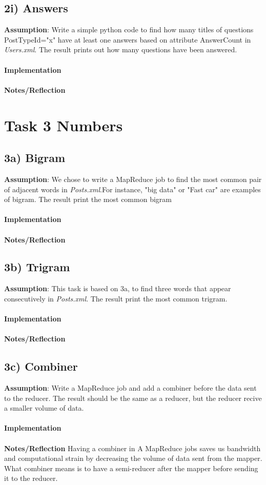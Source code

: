 \documentclass[fleqn,10pt]{wlscirep}
\begin{document}
\subsection*{2i) Answers }
\textbf{Assumption}: Write a simple python code to find how many titles of questions PostTypeId="x" have at least one answers based on attribute AnswerCount in \textit{Users.xml}. The result prints out how many questions have been answered.  \\ \\
\textbf{Implementation}  \\ \\
\textbf{Notes/Reflection}


\section*{Task 3 Numbers}

\subsection*{3a) Bigram }
\textbf{Assumption}: We chose to write a MapReduce job to find the most common pair of adjacent words in \textit{Posts.xml}.For instance, "big data" or "Fast car" are examples of bigram. The result print the most common bigram   \\\\
\textbf{Implementation}  \\ \\
\textbf{Notes/Reflection}


\subsection*{3b) Trigram }
\textbf{Assumption}: This task is based on 3a, to find three words that appear consecutively in \textit{Posts.xml}. The result print the most common trigram.  \\ \\
\textbf{Implementation}  \\ \\
\textbf{Notes/Reflection}


\subsection*{3c) Combiner }
\textbf{Assumption}: Write a MapReduce job and add a combiner before  the data sent to the reducer. The result should be the same as a reducer, but the reducer recive a smaller volume of data.  \\ \\
\textbf{Implementation}  \\ \\
\textbf{Notes/Reflection} Having a combiner in A MapReduce jobs saves us bandwidth and computational strain by decreasing the volume of data sent from the mapper.  What combiner means is to have a semi-reducer after the mapper before sending it to the reducer. 
\end{document}
